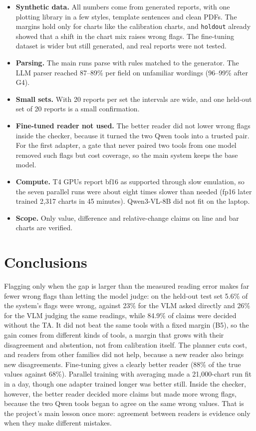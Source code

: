 \documentclass[11pt,a4paper]{article}
\newcommand{\code}[1]{\texttt{\small #1}}
\begin{document}
\begin{itemize}
\item \textbf{Synthetic data.} All numbers come from generated reports, with one plotting library in a few styles, template sentences and clean PDFs. The margins hold only for charts like the calibration charts, and \code{holdout} already showed that a shift in the chart mix raises wrong flags. The fine-tuning dataset is wider but still generated, and real reports were not tested.
\item \textbf{Parsing.} The main runs parse with rules matched to the generator. The LLM parser reached 87--89\% per field on unfamiliar wordings (96--99\% after G4).
\item \textbf{Small sets.} With 20 reports per set the intervals are wide, and one held-out set of 20 reports is a small confirmation.
\item \textbf{Fine-tuned reader not used.} The better reader did not lower wrong flags inside the checker, because it turned the two Qwen tools into a trusted pair. For the first adapter, a gate that never paired two tools from one model removed such flags but cost coverage, so the main system keeps the base model.
\item \textbf{Compute.} T4 GPUs report bf16 as supported through slow emulation, so the seven parallel runs were about eight times slower than needed (fp16 later trained 2{,}317 charts in 45 minutes). Qwen3-VL-8B did not fit on the laptop.
\item \textbf{Scope.} Only value, difference and relative-change claims on line and bar charts are verified.
\end{itemize}

\section{Conclusions}\label{sec:conclusion}

Flagging only when the gap is larger than the measured reading error makes far fewer wrong flags than letting the model judge: on the held-out test set 5.6\% of the system's flags were wrong, against 23\% for the VLM asked directly and 26\% for the VLM judging the same readings, while 84.9\% of claims were decided without the TA. It did not beat the same tools with a fixed margin (B5), so the gain comes from different kinds of tools, a margin that grows with their disagreement and abstention, not from calibration itself. The planner cuts cost, and readers from other families did not help, because a new reader also brings new disagreements. Fine-tuning gives a clearly better reader (88\% of the true values against 68\%). Parallel training with averaging made a 21{,}000-chart run fit in a day, though one adapter trained longer was better still. Inside the checker, however, the better reader decided more claims but made more wrong flags, because the two Qwen tools began to agree on the same wrong values. That is the project's main lesson once more: agreement between readers is evidence only when they make different mistakes.
\end{document}
